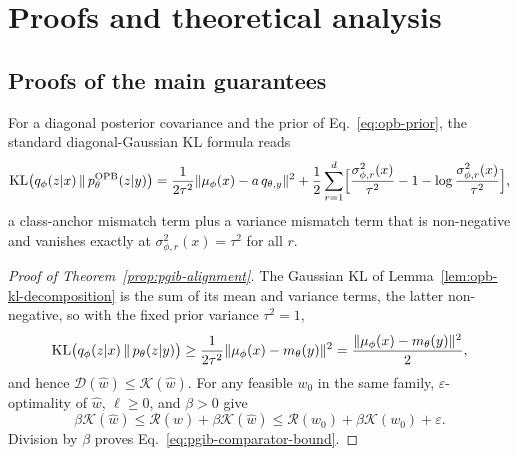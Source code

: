 \section{Proofs and theoretical analysis}
\label{app:theory}

\subsection{Proofs of the main guarantees}

\begin{lemma}
\label{lem:opb-kl-decomposition}
For a diagonal posterior covariance and the prior of Eq.~\eqref{eq:opb-prior}, the
standard diagonal-Gaussian KL formula reads
\begin{equation}
\operatorname{KL}\bigl(q_\phi(z|x)\,\|\,p_\theta^{\mathrm{OPB}}(z|y)\bigr)
= \frac{1}{2\tau^2}\|\mu_\phi(x) - a\,q_{\theta,y}\|^2
+ \frac12 \sum_{r=1}^{d}\Bigl[
\frac{\sigma_{\phi,r}^2(x)}{\tau^2} - 1 - \log\frac{\sigma_{\phi,r}^2(x)}{\tau^2}
\Bigr],
\label{eq:opb-kl-decomposition}
\end{equation}
a class-anchor mismatch term plus a variance mismatch term that is non-negative and
vanishes exactly at $\sigma_{\phi,r}^2(x) = \tau^2$ for all $r$.
\end{lemma}

\begin{proof}[Proof of Theorem~\ref{prop:pgib-alignment}]
The Gaussian KL of Lemma~\ref{lem:opb-kl-decomposition} is the sum of its mean and
variance terms, the latter non-negative, so with the fixed prior variance $\tau^2=1$,
\begin{equation*}
\operatorname{KL}\bigl(q_\phi(z|x)\,\|\,p_\theta(z|y)\bigr)
\ge\frac1{2\tau^2}\|\mu_\phi(x)-m_\theta(y)\|^2
=\frac{\|\mu_\phi(x)-m_\theta(y)\|^2}{2},
\end{equation*}
and hence $\mathcal D(\widehat w)\le\mathcal K(\widehat w)$. For any feasible $w_0$
in the same family, $\varepsilon$-optimality of $\widehat w$, $\ell\ge0$, and
$\beta>0$ give
\begin{equation*}
\beta\mathcal K(\widehat w)
\le \mathcal R(\widehat w)+\beta\mathcal K(\widehat w)
\le \mathcal R(w_0)+\beta\mathcal K(w_0)+\varepsilon.
\end{equation*}
Division by $\beta$ proves Eq.~\eqref{eq:pgib-comparator-bound}.
\end{proof}

